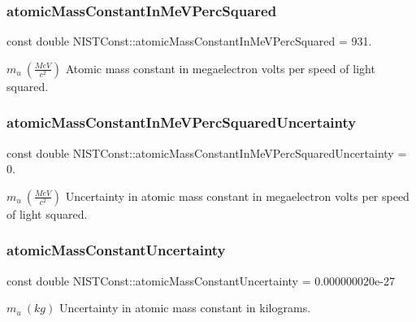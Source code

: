 \subsubsection{\texorpdfstring{atomic\+Mass\+Constant\+In\+Me\+V\+Perc\+Squared}{atomicMassConstantInMeVPercSquared}}
{\footnotesize\ttfamily const double N\+I\+S\+T\+Const\+::atomic\+Mass\+Constant\+In\+Me\+V\+Perc\+Squared = 931.}

$m_u \ (\frac{MeV}{c^2})$ Atomic mass constant in megaelectron volts per speed of light squared. \mbox{\label{group___n_i_s_t_const-_atomic_mass_constant_ga797d82fd682854b4c1b88754bed2e70a}} 
\subsubsection{\texorpdfstring{atomic\+Mass\+Constant\+In\+Me\+V\+Perc\+Squared\+Uncertainty}{atomicMassConstantInMeVPercSquaredUncertainty}}
{\footnotesize\ttfamily const double N\+I\+S\+T\+Const\+::atomic\+Mass\+Constant\+In\+Me\+V\+Perc\+Squared\+Uncertainty = 0.}

$m_u \ (\frac{MeV}{c^2})$ Uncertainty in atomic mass constant in megaelectron volts per speed of light squared. \mbox{\label{group___n_i_s_t_const-_atomic_mass_constant_gae44d47135c3f8d9e2b9c981649443efc}} 
\subsubsection{\texorpdfstring{atomic\+Mass\+Constant\+Uncertainty}{atomicMassConstantUncertainty}}
{\footnotesize\ttfamily const double N\+I\+S\+T\+Const\+::atomic\+Mass\+Constant\+Uncertainty = 0.\+000000020e-\/27}

$m_u \ (kg)$ Uncertainty in atomic mass constant in kilograms. 